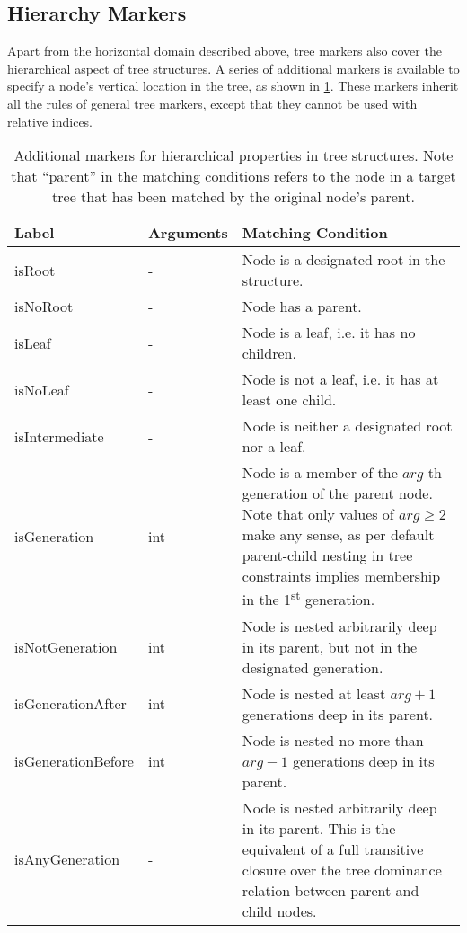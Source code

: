\documentclass[11pt,a4paper]{report}
\begin{document}
\subsection{Hierarchy Markers}
\label{sec:hierarchy-markers}
Apart from the horizontal domain described above, tree markers also cover the hierarchical aspect of tree structures.
A series of additional markers is available to specify a node's vertical location in the tree, as shown in \cref{tab:tree-hierarchy-markers}.
These markers inherit all the rules of general tree markers, except that they cannot be used with relative indices.%

\begin{table}[!htb]\centering
\begin{tabular}{|p{}|p{}|p{}|}
	\hline 
	\textbf{Label} & \textbf{Arguments} & \textbf{Matching Condition} \\ 
	\hline 
	\hline  
	isRoot & - & Node is a designated root in the structure. \\ 
	\hline 
	isNoRoot & - & Node has a parent. \\ 
	\hline 
	isLeaf & - & Node is a leaf, i.e. it has no children. \\  
	\hline 
	isNoLeaf & - & Node is not a leaf, i.e. it has at least one child. \\  
	\hline 
	isIntermediate & - & Node is neither a designated root nor a leaf. \\  
	\hline 
	isGeneration & int & Node is a member of the $arg$-th generation of the parent node. Note that only values of $arg \geq 2$ make any sense, as per default parent-child nesting in tree constraints implies membership in the 1\textsuperscript{st} generation. \\  
	\hline
	isNotGeneration & int & Node is nested arbitrarily deep in its parent, but not in the designated generation. \\  
	\hline  
	isGenerationAfter & int & Node is nested at least $arg+1$ generations deep in its parent. \\  
	\hline 
	isGenerationBefore & int & Node is nested no more than $arg-1$ generations deep in its parent. \\  
	\hline 
	isAnyGeneration & - & Node is nested arbitrarily deep in its parent. This is the equivalent of a full transitive closure over the tree dominance relation between parent and child nodes. \\  
	\hline 
\end{tabular}
\caption[Hierarchical markers]{Additional markers for hierarchical properties in tree structures. Note that ``parent'' in the matching conditions refers to the node in a target tree that has been matched by the original node's parent.}
\label{tab:tree-hierarchy-markers}
\end{table}
\end{document}
